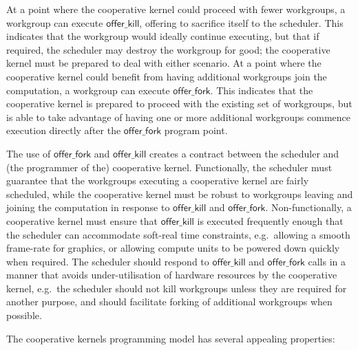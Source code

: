 \documentclass[numbers,nocopyrightspace,10pt]{sigplanconf}
\newcommand{\offerfork}{\mathsf{offer\_fork}}
\newcommand{\offerkill}{\mathsf{offer\_kill}}
\begin{document}
At a point where the cooperative kernel could proceed with fewer
workgroups, a workgroup can execute $\offerkill$, offering to
sacrifice itself to the scheduler.  This indicates that the workgroup
would ideally continue executing, but that if required, the
scheduler may destroy the workgroup for good; the cooperative kernel
must be prepared to deal with either scenario.
%
At a point where the cooperative kernel could benefit from having
additional workgroups join the computation, a workgroup can execute
$\offerfork$.  This indicates that the cooperative
kernel is prepared to proceed with the existing set of workgroups, but
is able to take advantage of having one or more additional workgroups
commence execution directly after the $\offerfork$ program point.

The use of $\offerfork$ and $\offerkill$ creates a contract between
the scheduler and (the programmer of the) cooperative kernel.
Functionally, the
scheduler must guarantee that the workgroups executing a cooperative
kernel are fairly scheduled, while the cooperative kernel must be
robust to workgroups leaving and joining the computation in response
to $\offerkill$ and $\offerfork$.  Non-functionally, a cooperative
kernel must ensure that $\offerkill$ is executed frequently enough
that the scheduler can accommodate soft-real time constraints,
e.g.\ allowing a smooth frame-rate for graphics, or allowing compute
units to be powered down quickly when required.  The scheduler should
respond to $\offerkill$ and $\offerfork$ calls in a manner that avoids
under-utilisation of hardware resources by the cooperative kernel,
e.g.\ the scheduler should not kill workgroups unless they are
required for another purpose, and should facilitate forking of
additional workgroups when possible.

The cooperative kernels programming model has several appealing
properties:
\end{document}
